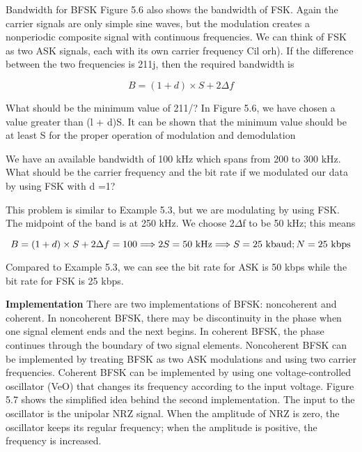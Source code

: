 Bandwidth for BFSK Figure 5.6 also shows the bandwidth of FSK. Again the carrier signals are only simple sine waves, but the modulation creates a nonperiodic composite signal with continuous frequencies. We can think of FSK as two ASK signals, each with its own carrier frequency Cil orh). If the difference between the two frequencies is 211j, then the required bandwidth is

\begin{equation}
  B = (1 + d) \times S + 2\Delta f
\end{equation}

What should be the minimum value of 211/? In Figure 5.6, we have chosen a value greater than (l + d)S. It can be shown that the minimum value should be at least S for the proper operation of modulation and demodulation

\begin{example}
  We have an available bandwidth of 100 kHz which spans from 200 to 300 kHz. What should be the carrier frequency and the bit rate if we modulated our data by using FSK with d =1?
\end{example}

\begin{solution}
  This problem is similar to Example 5.3, but we are modulating by using FSK. The midpoint of the band is at 250 kHz. We choose 2$\Delta$f to be 50 kHz; this means
  
  \begin{equation*}
    B = (1 + d) \times S + 2\Delta f = 100 \Longrightarrow 2S = 50 \textnormal{ kHz} \Longrightarrow S = 25 \textnormal{ kbaud}; N = 25 \textnormal{ kbps}
  \end{equation*}

  \noindent Compared to Example 5.3, we can see the bit rate for ASK is 50 kbps while the bit rate for FSK is 25 kbps.
\end{solution}

\textbf{Implementation} There are two implementations of BFSK: noncoherent and coherent. In noncoherent BFSK, there may be discontinuity in the phase when one signal element ends and the next begins. In coherent BFSK, the phase continues through the boundary of two signal elements. Noncoherent BFSK can be implemented by treating BFSK as two ASK modulations and using two carrier frequencies. Coherent BFSK can be implemented by using one voltage-controlled oscillator (VeO) that changes its frequency according to the input voltage. Figure 5.7 shows the simplified idea behind the second implementation. The input to the oscillator is the unipolar NRZ signal. When the amplitude of NRZ is zero, the oscillator keeps its regular frequency; when the amplitude is positive, the frequency is increased.

